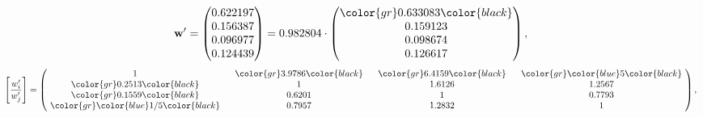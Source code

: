 \begin{example}
\begin{equation*}
\mathbf{w}^{\prime} =
\begin{pmatrix}
0.622197\\
0.156387\\
0.096977\\
0.124439
\end{pmatrix} =
0.982804\cdot
\begin{pmatrix}
\color{gr} 0.633083\color{black} \\
0.159123\\
0.098674\\
0.126617
\end{pmatrix},
\end{equation*}
\begin{equation*}
\left[ \frac{{w}^{\prime}_i}{{w}^{\prime}_j} \right] =
\begin{pmatrix}
$\,\,$ 1 $\,\,$ & $\,\,$\color{gr} 3.9786\color{black} $\,\,$ & $\,\,$\color{gr} 6.4159\color{black} $\,\,$ & $\,\,$\color{gr} \color{blue} 5\color{black} $\,\,$ \\
$\,\,$\color{gr} 0.2513\color{black} $\,\,$ & $\,\,$ 1 $\,\,$ & $\,\,$1.6126$\,\,$ & $\,\,$1.2567  $\,\,$ \\
$\,\,$\color{gr} 0.1559\color{black} $\,\,$ & $\,\,$0.6201$\,\,$ & $\,\,$ 1 $\,\,$ & $\,\,$0.7793 $\,\,$ \\
$\,\,$\color{gr} \color{blue}  1/5\color{black} $\,\,$ & $\,\,$0.7957$\,\,$ & $\,\,$1.2832$\,\,$ & $\,\,$ 1  $\,\,$ \\
\end{pmatrix},
\end{equation*}
\end{example}
\newpage
